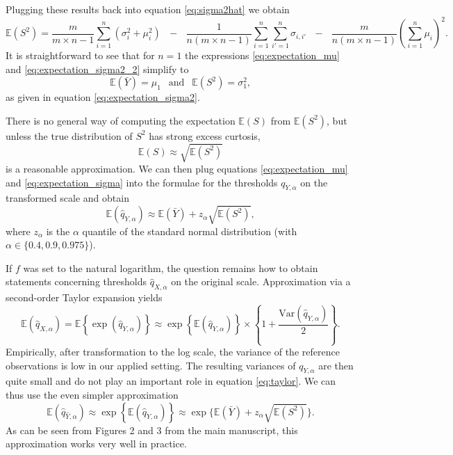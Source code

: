 \documentclass[12pt]{article}
\begin{document}
Plugging these results back into equation \eqref{eq:sigma2hat} we obtain
\begin{equation}
\mathbb{E}(S^2) = \frac{m}{m \times n - 1} \sum_{i = 1}^n (\sigma_{i}^2 + \mu_i^2) \ \ \ - \ \ \ \frac{1}{n(m \times n - 1)} \sum_{i = 1}^n \sum_{i' = 1}^n \sigma_{i,i'} \ \ \ - \ \ \ \frac{m}{n(m \times n - 1)}\left(\sum_{i = 1}^n \mu_i\right)^2.
\label{eq:expectation_sigma2_2}
\end{equation}
It is straightforward to see that for $n = 1$ the expressions \eqref{eq:expectation_mu} and \eqref{eq:expectation_sigma2_2} simplify to
$$
\mathbb{E}(\bar{Y}) = \mu_1 \ \ \text{ and } \ \ \mathbb{E}(S^2) = \sigma^2_1,
$$
as given in equation \eqref{eq:expectation_sigma2}.

There is no general way of computing the expectation $\mathbb{E}(S)$ from $\mathbb{E}(S^2)$, but unless the true distribution of  $S^2$ has strong excess curtosis,
\begin{equation}
\mathbb{E}(S) \approx \sqrt{\mathbb{E}(S^2)}
\label{eq:expectation_sigma}
\end{equation}
is a reasonable approximation. We can then plug equations \eqref{eq:expectation_mu} and \eqref{eq:expectation_sigma} into the formulae for the thresholds $q_{Y, \alpha}$ on the transformed scale and obtain
$$
\mathbb{E}(\hat{q}_{Y, \alpha}) \approx \mathbb{E}(\bar{Y}) + z_\alpha \sqrt{\mathbb{E}(S^2)},
$$
where $z_\alpha$ is the $\alpha$ quantile of the standard normal distribution (with $\alpha \in \{0.4, 0.9, 0.975\}$).

If $f$ was set to the natural logarithm, the question remains how to obtain statements concerning thresholds $\hat{q}_{X, \alpha}$ on the original scale. Approximation via a second-order Taylor expansion yields
\begin{equation}
\mathbb{E}(\hat{q}_{X, \alpha}) = \mathbb{E}\left\{\exp(\hat{q}_{Y, \alpha})\right\} \approx \exp\left\{\mathbb{E}(\hat{q}_{Y, \alpha})\right\} \times \left\{1 + \frac{\text{Var}(\hat{q}_{Y, \alpha})}{2} \right\}.
\label{eq:taylor}
\end{equation}
Empirically, after transformation to the log scale, the variance of the reference observations is low in our applied setting. The resulting variances of $q_{Y, \alpha}$ are then quite small and do not play an important role in equation \eqref{eq:taylor}. We can thus use the even simpler approximation
\begin{equation}
\mathbb{E}(\hat{q}_{\hat{Y}, \alpha}) \approx \exp\left\{\mathbb{E}(\hat{q}_{Y, \alpha})\right\} \approx \exp\{\mathbb{E}(\bar{Y}) + z_\alpha \sqrt{\mathbb{E}(S^2)}\}.
\end{equation}
As can be seen from Figures 2 and 3 from the main manuscript, this approximation works very well in practice. %
\end{document}
